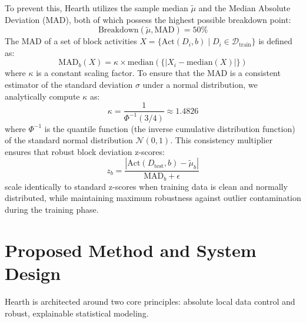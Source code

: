 \documentclass[conference]{IEEEtran}
\begin{document}
To prevent this, Hearth utilizes the sample median $\tilde{\mu}$ and the Median Absolute Deviation (MAD), both of which possess the highest possible breakdown point:
\begin{equation}
\text{Breakdown}(\tilde{\mu}, \text{MAD}) = 50\%
\end{equation}
The MAD of a set of block activities $X = \{\text{Act}(D_i, b) \mid D_i \in \mathcal{D}_{\text{train}}\}$ is defined as:
\begin{equation}
\text{MAD}_b(X) = \kappa \times \text{median}(\{|X_i - \text{median}(X)|\})
\end{equation}
where $\kappa$ is a constant scaling factor. To ensure that the MAD is a consistent estimator of the standard deviation $\sigma$ under a normal distribution, we analytically compute $\kappa$ as:
\begin{equation}
\kappa = \frac{1}{\Phi^{-1}(3/4)} \approx 1.4826
\end{equation}
where $\Phi^{-1}$ is the quantile function (the inverse cumulative distribution function) of the standard normal distribution $\mathcal{N}(0, 1)$. This consistency multiplier ensures that robust block deviation z-scores:
\begin{equation}
z_b = \frac{|\text{Act}(D_{\text{test}}, b) - \tilde{\mu}_b|}{\text{MAD}_b + \epsilon}
\end{equation}
scale identically to standard z-scores when training data is clean and normally distributed, while maintaining maximum robustness against outlier contamination during the training phase.

\section{Proposed Method and System Design}

Hearth is architected around two core principles: absolute local data control and robust, explainable statistical modeling.
\end{document}
